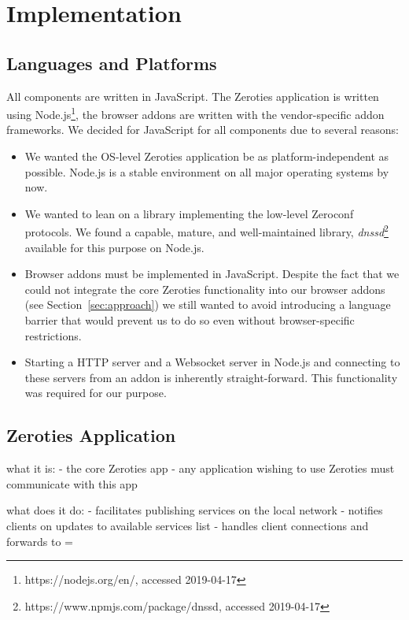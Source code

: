 \section{Implementation}
\label{sec:implementation}

\subsection{Languages and Platforms}
\label{sub:languages_and_platforms}

All components are written in JavaScript. 
The Zeroties application is written using Node.js\footnote{https://nodejs.org/en/, accessed 2019-04-17}, the browser addons are written with the vendor-specific addon frameworks.
We decided for JavaScript for all components due to several reasons:
\begin{itemize}
\item We wanted the OS-level Zeroties application be as platform-independent as possible. 
Node.js is a stable environment on all major operating systems by now.
\item We wanted to lean on a library implementing the low-level Zeroconf protocols.
We found a capable, mature, and well-maintained library, \textit{dnssd}\footnote{https://www.npmjs.com/package/dnssd, accessed 2019-04-17} available for this purpose on Node.js.
\item Browser addons must be implemented in JavaScript.
Despite the fact that we could not integrate the core Zeroties functionality into our browser addons (see Section~\ref{sec:approach}) we still wanted to avoid  introducing a language barrier that would prevent us to do so even without browser-specific restrictions.
\item Starting a HTTP server and a Websocket server in Node.js and connecting to these servers from an addon is inherently straight-forward.
This functionality was required for our purpose.
\end{itemize}

\subsection{Zeroties Application}
\label{sub:zeroties_application}

what it is:
- the core Zeroties app
- any application wishing to use Zeroties must communicate with this app

what does it do:
- facilitates publishing services on the local network
- notifies clients on updates to available services list
- handles client connections and forwards to =


